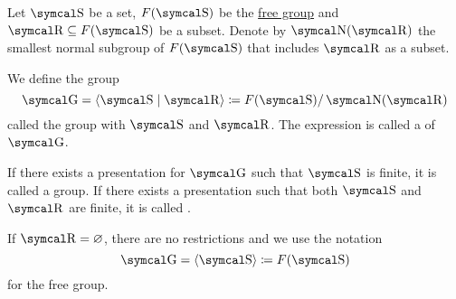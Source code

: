 \begin{definition}\label{def:group_presentation}
  Let \( \CS \) be a set, \( F(\CS) \) be the \hyperref[def:free_group]{free group} and \( \CR \subseteq F(\CS) \) be a subset. Denote by \( \CN(\CR) \) the smallest normal subgroup of \( F(\CS) \) that includes \( \CR \) as a subset.

  We define the group
  \begin{equation}\label{eq:def:group_presentation/presentation}
    \CG = \Braket{ \CS \mid \CR} \coloneqq F(\CS) / \CN(\CR)
  \end{equation}
  called the group with  \( \CS \) and  \( \CR \). The expression  is called a  of \( \CG \).

  If there exists a presentation for \( \CG \) such that \( \CS \) is finite, it is called a  group. If there exists a presentation such that both \( \CS \) and \( \CR \) are finite, it is called .

  If \( \CR = \varnothing \), there are no restrictions and we use the notation
  \begin{equation}\label{eq:def:group_presentation/free}
    \CG = \Braket{ \CS } \coloneqq F(\CS)
  \end{equation}
  for the free group.
\end{definition}

